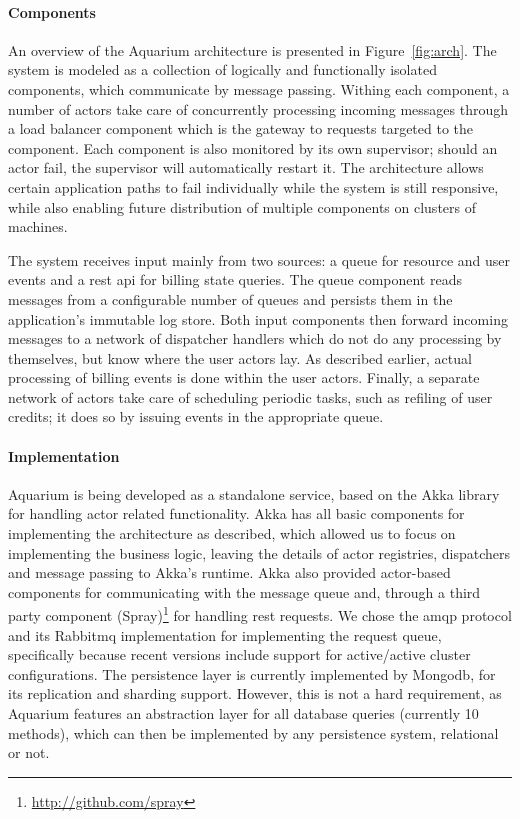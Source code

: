 \paragraph{Components} An overview of the Aquarium architecture is presented in
Figure~\ref{fig:arch}.  The system is modeled as a collection of logically and
functionally isolated components, which communicate by message passing. Withing
each component, a number of actors take care of concurrently processing
incoming messages through a load balancer component which is the gateway to
requests targeted to the component. Each component is also monitored by its own
supervisor; should an actor fail, the supervisor will automatically restart it.
The architecture allows certain application paths to fail individually while
the system is still responsive, while also enabling future distribution of
multiple components on clusters of machines.

The system receives input mainly from two sources: a queue for resource and
user events and a {\sc rest api} for billing state queries. The queue component
reads messages from a configurable number of queues and persists them in the
application's immutable log store. Both input components then forward incoming
messages to a network of dispatcher handlers which do not do any processing by
themselves, but know where the user actors lay. As described earlier, actual
processing of billing events is done within the user actors. Finally, a
separate network of actors take care of scheduling periodic tasks, such as
refiling of user credits; it does so by issuing events in the appropriate
queue.

\paragraph{Implementation}

Aquarium is being developed as a standalone service, based on the Akka library
for handling actor related functionality. Akka has all basic components for
implementing the architecture as described, which allowed us to focus on
implementing the business logic, leaving the details of actor registries,
dispatchers and message passing to Akka's runtime. Akka also provided
actor-based components for communicating with the message queue and, through a
third party component (Spray)\footnote{\url{http://github.com/spray}} for handling {\sc rest} requests.  We chose the
{\sc amqp} protocol and its Rabbit{\sc mq} implementation for implementing the
request queue, specifically because recent versions include support for
active/active cluster configurations. The persistence layer is currently
implemented by Mongo{\sc db}, for its replication and sharding support.
However, this is not a hard requirement, as Aquarium features an abstraction
layer for all database queries (currently 10 methods), which can then be
implemented by any persistence system, relational or not.
